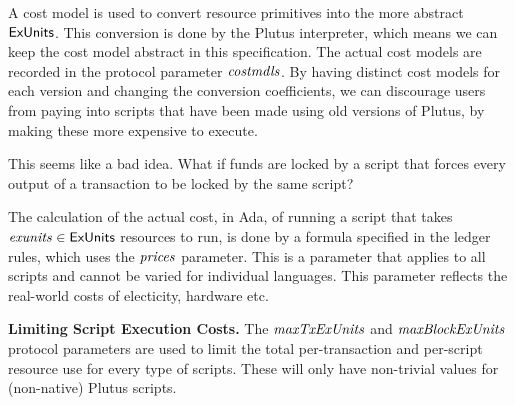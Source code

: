 A cost model is used to convert resource
primitives into the
more abstract $\mathsf{ExUnits}$. This conversion is done by the Plutus interpreter,
which means we can keep the cost model abstract in this specification.
The actual cost models are recorded in the protocol
parameter $\mathit{costmdls}$.
%
By having distinct cost models for each version and changing the conversion coefficients, we can discourage users from
paying into scripts that have been made using old versions of Plutus, by making these more expensive to execute.
\begin{note}
  This seems like a bad idea. What if funds are locked by a script that forces every output of a transaction to be locked by the same script?
\end{note}
%
The calculation of the actual cost, in Ada, of running
a script that takes $\mathit{exunits} \in \mathsf{ExUnits}$ resources to run,
is done by a formula specified in the ledger rules, which uses the
$\mathit{prices}$ parameter. This is a parameter that applies to all
scripts and cannot be varied for individual languages. This parameter
reflects the real-world costs of electicity, hardware etc.

\textbf{Limiting Script Execution Costs.}
The $\mathit{maxTxExUnits}$ and $\mathit{maxBlockExUnits}$  protocol parameters are
used to limit the total per-transaction and per-script resource use for every
type of scripts. These will only have non-trivial values for
(non-native) Plutus scripts.

